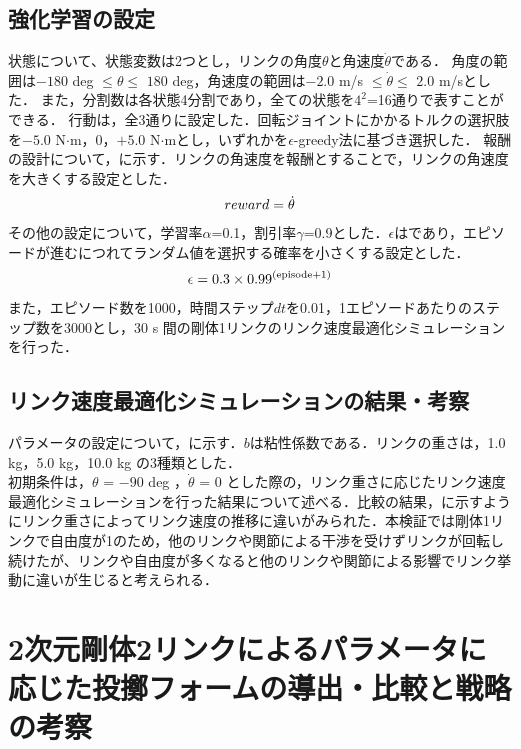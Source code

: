 \begin{small}
\subsection{強化学習の設定}
状態について、状態変数は2つとし，リンクの角度$\theta$と角速度$\dot{\theta}$である．
角度の範囲は$-180$ deg $\leq \theta \leq$ $180$ deg，角速度の範囲は$-2.0$ m/s $\leq \dot{\theta} \leq$ $2.0$ m/sとした．
また，分割数は各状態4分割であり，全ての状態を$4^{2}$=16通りで表すことができる．
行動は，全3通りに設定した．回転ジョイントにかかるトルクの選択肢を$-5.0$ N$\cdot$m，$0$，$+5.0$ N$\cdot$mとし，いずれかを$\epsilon$-greedy法に基づき選択した．
報酬の設計について，に示す．リンクの角速度を報酬とすることで，リンクの角速度を大きくする設定とした．
\begin{eqnarray}
  \equlabel{3}
  reward = \dot{\theta}
\end{eqnarray}
その他の設定について，学習率$\alpha$=0.1，割引率$\gamma$=0.9とした．$\epsilon$はであり，エピソードが進むにつれてランダム値を選択する確率を小さくする設定とした．
\begin{eqnarray}
  \equlabel{4}
  \epsilon = 0.3 \times 0.99^{(\mathrm{episode} + 1)}
\end{eqnarray}
また，エピソード数を1000，時間ステップ$dt$を0.01，1エピソードあたりのステップ数を3000とし，30 s 間の剛体1リンクのリンク速度最適化シミュレーションを行った．
\subsection{リンク速度最適化シミュレーションの結果・考察}
パラメータの設定について，に示す．$b$は粘性係数である．リンクの重さは，1.0 kg，5.0 kg，10.0 kg の3種類とした．\\
初期条件は，$\theta$ = $-90$ deg ，$\dot{\theta}$ = 0 とした際の，リンク重さに応じたリンク速度最適化シミュレーションを行った結果について述べる．比較の結果，に示すようにリンク重さによってリンク速度の推移に違いがみられた．本検証では剛体1リンクで自由度が1のため，他のリンクや関節による干渉を受けずリンクが回転し続けたが、リンクや自由度が多くなると他のリンクや関節による影響でリンク挙動に違いが生じると考えられる．
\section{2次元剛体2リンクによるパラメータに応じた投擲フォームの導出・比較と戦略の考察}

\end{small}
